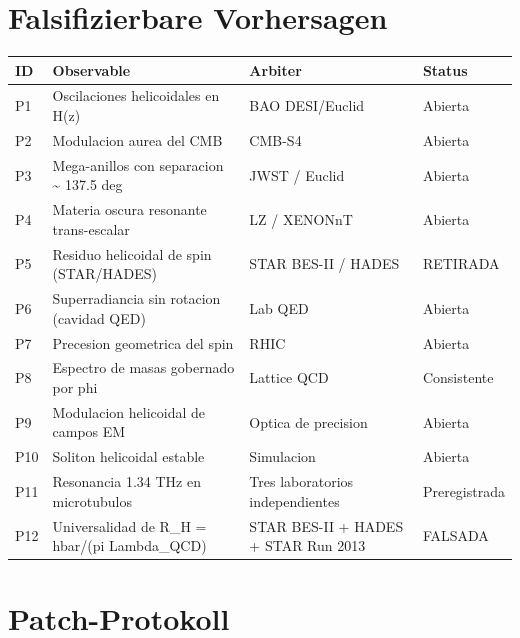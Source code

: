 ﻿\documentclass[11pt,letterpaper]{article}
\begin{document}
\newpage
\section*{Falsifizierbare Vorhersagen}

\begin{longtable}{@{}p{0.8cm}p{5.5cm}p{3.5cm}p{2.5cm}@{}}
\toprule
\textbf{ID} & \textbf{Observable} & \textbf{Arbiter} & \textbf{Status} \\
\midrule
\endhead
P1 & Oscilaciones helicoidales en H(z) & BAO DESI/Euclid & Abierta \\
P2 & Modulacion aurea del CMB & CMB-S4 & Abierta \\
P3 & Mega-anillos con separacion \textasciitilde{} 137.5 deg & JWST / Euclid & Abierta \\
P4 & Materia oscura resonante trans-escalar & LZ / XENONnT & Abierta \\
P5 & Residuo helicoidal de spin (STAR/HADES) & STAR BES-II / HADES & RETIRADA \\
P6 & Superradiancia sin rotacion (cavidad QED) & Lab QED & Abierta \\
P7 & Precesion geometrica del spin & RHIC & Abierta \\
P8 & Espectro de masas gobernado por phi & Lattice QCD & Consistente \\
P9 & Modulacion helicoidal de campos EM & Optica de precision & Abierta \\
P10 & Soliton helicoidal estable & Simulacion & Abierta \\
P11 & Resonancia 1.34 THz en microtubulos & Tres laboratorios independientes & Preregistrada \\
P12 & Universalidad de R\_H = hbar/(pi Lambda\_QCD) & STAR BES-II + HADES + STAR Run 2013 & FALSADA \\
\bottomrule
\end{longtable}

\newpage
\section{Patch-Protokoll}
\end{document}
